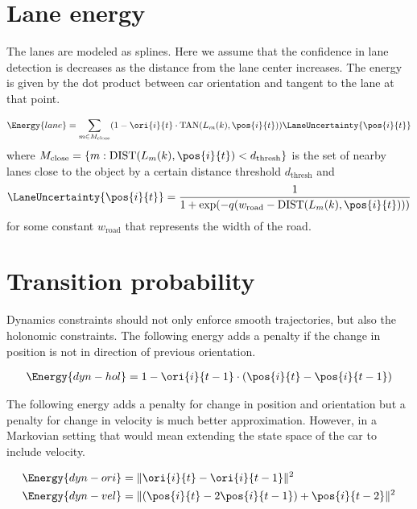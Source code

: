 \section{Lane energy}
\label{sec:laneEnergy}
 The lanes are modeled as splines. Here we assume that the confidence in lane
 detection is decreases as the distance from the lane center increases.  The
 energy is given by the dot product between car orientation and tangent to the
 lane at that point.

\begin{align}
  \label{eq:laneOrientationEnergy}
  \Energy{lane} = 
  \sum_{m \in M_{\text{close}}}
  (1 - \ori{i}{t} \cdot \text{TAN}(L_{m}(k), \pos{i}{t}) )
\LaneUncertainty{\pos{i}{t}}
\end{align}
where $M_{\text{close}} = \{m : \text{DIST}(L_{m}(k), \pos{i}{t}) < d_{\text{thresh}}\} $ is
the set of nearby lanes close to the object by a certain distance threshold $d_{\text{thresh}}$ and 
\begin{align}
\LaneUncertainty{\pos{i}{t}} = 
  \frac{1}{1 + \exp(-q(w_{\text{road}} - \text{DIST}(L_{m}(k), \pos{i}{t})))}
\end{align}
for some constant $w_{\text{road}}$ that represents the width of the road.

\section{Transition probability}
Dynamics constraints should not only enforce smooth trajectories, but also the
holonomic constraints.  The following energy adds a penalty if the change in
position is not in direction of previous orientation.

\begin{align}
  \label{eq:totalPosTransitionEnergy}
  \Energy{dyn-hol} = 1 - \ori{i}{t-1} \cdot (\pos{i}{t} - \pos{i}{t-1})
\end{align}

The following energy adds a penalty for change in position and orientation
but a penalty for change in velocity is much better approximation. However, in
a Markovian setting that would mean extending the state space of the car to
include velocity.

\begin{align}
  \Energy{dyn-ori} &= \|\ori{i}{t} - \ori{i}{t-1}\|^2\\
  \Energy{dyn-vel} &= \|(\pos{i}{t} - 2\pos{i}{t-1}) + \pos{i}{t-2}\|^2
\end{align}

